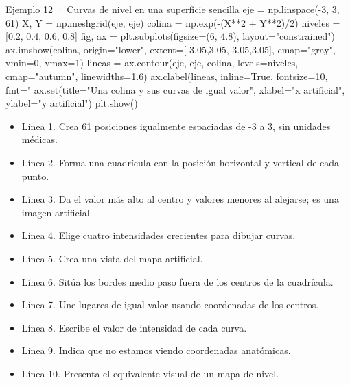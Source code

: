 \begin{Codigo}{Ejemplo 12 · Curvas de nivel en una superficie sencilla}
eje = np.linspace(-3, 3, 61)
X, Y = np.meshgrid(eje, eje)
colina = np.exp(-(X**2 + Y**2)/2)
niveles = [0.2, 0.4, 0.6, 0.8]
fig, ax = plt.subplots(figsize=(6, 4.8), layout="constrained")
ax.imshow(colina, origin="lower", extent=[-3.05,3.05,-3.05,3.05], cmap="gray", vmin=0, vmax=1)
lineas = ax.contour(eje, eje, colina, levels=niveles, cmap="autumn", linewidths=1.6)
ax.clabel(lineas, inline=True, fontsize=10, fmt="%
ax.set(title="Una colina y sus curvas de igual valor", xlabel="x artificial", ylabel="y artificial")
plt.show()
\end{Codigo}


\begin{itemize}

\item Línea 1. Crea 61 posiciones igualmente espaciadas de -3 a 3, sin unidades médicas.

\item Línea 2. Forma una cuadrícula con la posición horizontal y vertical de cada punto.

\item Línea 3. Da el valor más alto al centro y valores menores al alejarse; es una imagen artificial.

\item Línea 4. Elige cuatro intensidades crecientes para dibujar curvas.

\item Línea 5. Crea una vista del mapa artificial.

\item Línea 6. Sitúa los bordes medio paso fuera de los centros de la cuadrícula.

\item Línea 7. Une lugares de igual valor usando coordenadas de los centros.

\item Línea 8. Escribe el valor de intensidad de cada curva.

\item Línea 9. Indica que no estamos viendo coordenadas anatómicas.

\item Línea 10. Presenta el equivalente visual de un mapa de nivel.

\end{itemize}


